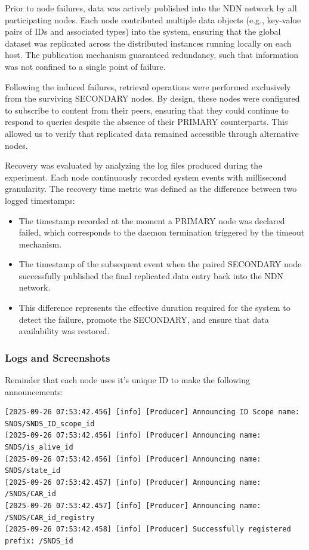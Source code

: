 \documentclass{article}
\begin{document}
Prior to node failures, data was actively published into the NDN network by all participating nodes. Each node contributed multiple data objects (e.g., key-value pairs of IDs and associated types) into the system, ensuring that the global dataset was replicated across the distributed instances running locally on each host. The publication mechanism guaranteed redundancy, such that information was not confined to a single point of failure.

Following the induced failures, retrieval operations were performed exclusively from the surviving SECONDARY nodes. By design, these nodes were configured to subscribe to content from their peers, ensuring that they could continue to respond to queries despite the absence of their PRIMARY counterparts. This allowed us to verify that replicated data remained accessible through alternative nodes.

Recovery was evaluated by analyzing the log files produced during the experiment. Each node continuously recorded system events with millisecond granularity. The recovery time metric was defined as the difference between two logged timestamps:

\begin{itemize}
    \item The timestamp recorded at the moment a PRIMARY node was declared failed, which corresponds to the daemon termination triggered by the timeout mechanism.
    \item The timestamp of the subsequent event when the paired SECONDARY node successfully published the final replicated data entry back into the NDN network.
    \item This difference represents the effective duration required for the system to detect the failure, promote the SECONDARY, and ensure that data availability was restored.
\end{itemize}

\subsubsection{Logs and Screenshots}

Reminder that each node uses it's unique ID to make the following announcements:
\begin{lstlisting}[language=log,caption={Local announcements for each Node},label={lst:announcements-for-node-a}]
[2025-09-26 07:53:42.456] [info] [Producer] Announcing ID Scope name: SNDS/SNDS_ID_scope_id
[2025-09-26 07:53:42.456] [info] [Producer] Announcing name: SNDS/is_alive_id
[2025-09-26 07:53:42.456] [info] [Producer] Announcing name: SNDS/state_id
[2025-09-26 07:53:42.457] [info] [Producer] Announcing name: /SNDS/CAR_id
[2025-09-26 07:53:42.457] [info] [Producer] Announcing name: /SNDS/CAR_id_registry
[2025-09-26 07:53:42.458] [info] [Producer] Successfully registered prefix: /SNDS_id  

\end{lstlisting}
\end{document}
